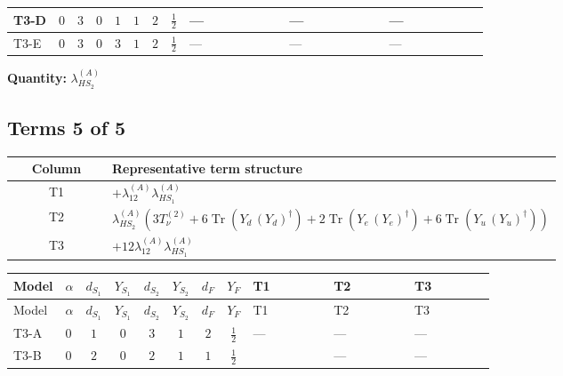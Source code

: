 \documentclass[8pt]{article}
\begin{document}
\begin{landscape}
\begin{longtable}{@{}llcccccc >{\raggedright\arraybackslash}p{0.21\linewidth} >{\raggedright\arraybackslash}p{0.21\linewidth} >{\raggedright\arraybackslash}p{0.21\linewidth}@{}}
\midrule
T3-D & $0$ & $3$ & $0$ & $1$ & $1$ & $2$ & $\frac{1}{2}$ & --- & --- & --- \\
\midrule
T3-E & $0$ & $3$ & $0$ & $3$ & $1$ & $2$ & $\frac{1}{2}$ & --- & --- & --- \\
\midrule
\bottomrule
\end{longtable}
\clearpage
\noindent\textbf{Quantity: }$\lambda_{HS_2}^{(A)}$\par\smallskip
\subsection*{Terms 5 of 5}
\begin{center}
\begin{tabular}{@{}c >{\raggedright\arraybackslash}p{0.82\linewidth}@{}}
\toprule
Column & Representative term structure \\
\midrule
T1 & \(\displaystyle +{\lambda_{12}^{(A)}} {\lambda_{HS_1}^{(A)}}\) \\
\midrule
T2 & \(\displaystyle {\lambda_{HS_2}^{(A)}} (3 T_{\nu}^{(2)}+6 \operatorname{Tr}\!\left({Y_d}\,\left({Y_d}\right)^{\dagger}\right)+2 \operatorname{Tr}\!\left({Y_e}\,\left({Y_e}\right)^{\dagger}\right)+6 \operatorname{Tr}\!\left({Y_u}\,\left({Y_u}\right)^{\dagger}\right))\) \\
\midrule
T3 & \(\displaystyle +12 {\lambda_{12}^{(A)}} {\lambda_{HS_1}^{(A)}}\) \\
\midrule
\bottomrule
\end{tabular}
\end{center}
\smallskip
\tiny
\begin{longtable}{@{}llcccccc >{\raggedright\arraybackslash}p{0.21\linewidth} >{\raggedright\arraybackslash}p{0.21\linewidth} >{\raggedright\arraybackslash}p{0.21\linewidth}@{}}
\toprule
Model & $\alpha$ & $d_{S_1}$ & $Y_{S_1}$ & $d_{S_2}$ & $Y_{S_2}$ & $d_F$ & $Y_F$ & T1 & T2 & T3 \\
\midrule
\endfirsthead
\toprule
Model & $\alpha$ & $d_{S_1}$ & $Y_{S_1}$ & $d_{S_2}$ & $Y_{S_2}$ & $d_F$ & $Y_F$ & T1 & T2 & T3 \\
\midrule
\endhead
T3-A & $0$ & $1$ & $0$ & $3$ & $1$ & $2$ & $\frac{1}{2}$ & --- & --- & --- \\
\midrule
T3-B & $0$ & $2$ & $0$ & $2$ & $1$ & $1$ & $\frac{1}{2}$ & \scriptsize\adjustbox{max width=\linewidth}{$\begin{gathered} +{\lambda_{12}^{(A)}} {\lambda_{HS_1}^{(A)}}\end{gathered}$} & --- & --- \\

\end{longtable}
\end{landscape}
\end{document}
